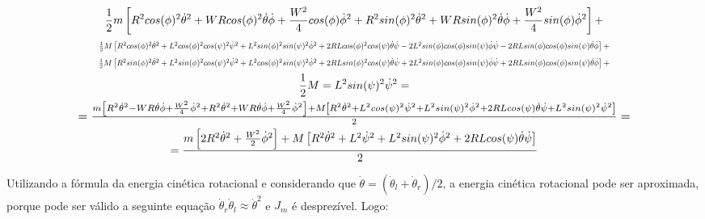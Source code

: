 \documentclass[10pt]{article}
\begin{document}
\begin{equation}
\begin{gathered}
    \frac{1}{2}m \left[R^2cos(\phi)^2\dot{\theta}^2 + WR cos(\phi)^2\dot{\theta}\dot{\phi} + \frac{W^2}{4}cos(\phi)\dot{\phi}^2 + R^2sin(\phi)^2\dot{\theta}^2 + WR sin(\phi)^2\dot{\theta}\dot{\phi} + \frac{W^2}{4}sin(\phi)\dot{\phi}^2\right] + \\
    \scalebox{0.7}{$
    \frac{1}{2}M \left[ R^2cos(\phi)^2\dot{\theta}^2 + L^2cos(\phi)^2cos(\psi)^2\dot{\psi}^2 + L^2sin(\phi)^2sin(\psi)^2\dot{\phi}^2 + 2RLcos(\phi)^2cos(\psi)\dot{\theta}\dot{\psi} - 2L^2sin(\phi)cos(\phi)sin(\psi)\dot{\phi}\dot{\psi} - 2RLsin(\phi)cos(\phi)sin(\psi)\dot{\theta}\dot{\phi} \right] +
    $}\\
    \scalebox{0.7}{$
    \frac{1}{2}M \left[ R^2sin(\phi)^2\dot{\theta}^2 + L^2sin(\phi)^2cos(\psi)^2\dot{\psi}^2 + L^2cos(\phi)^2sin(\psi)^2\dot{\phi}^2 + 2RLsin(\phi)^2cos(\psi)\dot{\theta}\dot{\psi} + 2L^2sin(\phi)cos(\phi)sin(\psi)\dot{\phi}\dot{\psi} + 2RLsin(\phi)cos(\phi)sin(\psi)\dot{\theta}\dot{\phi} \right] +
    $}\\
    \frac{1}{2}M = L^2sin(\psi)^2\dot{\psi}^2 = \\
    \scalebox{1.1}{$
    = \frac{m \left[R^2\dot{\theta}^2 - WR\dot{\theta}\dot{\phi} + \frac{W^2}{4}\dot{\phi}^2 + R^2\dot{\theta}^2 + WR\dot{\theta}\dot{\phi} + \frac{W^2}{4}\dot{\phi}^2\right] + M \left[ R^2 \dot{\theta}^2 + L^2cos(\psi)^2\dot{\psi}^2 + L^2 sin(\psi)^2 \dot{\phi}^2 + 2RL cos(\psi)\dot{\theta}\dot{\psi} + L^2sin(\psi)^2\dot{\psi}^2 \right]}{2} =
    $}\\
    = \frac{m \left[2R^2\dot{\theta}^2 + \frac{W^2}{2}\dot{\phi}^2\right] + M \left[ R^2 \dot{\theta}^2 + L^2\dot{\psi}^2 + L^2 sin(\psi)^2 \dot{\phi}^2 + 2RL cos(\psi)\dot{\theta}\dot{\psi}\right]}{2}
\end{gathered}
\end{equation}

\quad Utilizando a fórmula da energia cinética rotacional e considerando que $\dot{\theta} = (\dot{\theta}_l + \dot{\theta}_r)/2$,
a energia cinética rotacional pode ser aproximada, porque pode ser válido a seguinte equação $\dot{\theta}_r \dot{\theta}_l \approx \dot{\theta}^2$ e $J_m$ é desprezível. Logo:
\end{document}
